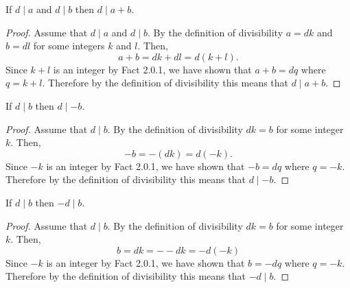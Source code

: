 \documentclass{report}
\begin{document}
\begin{proposition}{}{}
  If $d \mid a$ and $d \mid b$ then $d \mid a + b$.
\end{proposition}

\begin{proof}
  Assume that $d \mid a$ and $d \mid b$.
  By the definition of divisibility $a = dk$ and $b = dl$ for some integers $k$ and $l$.
  Then, $$a + b = dk + dl = d(k + l).$$
  Since $k + l$ is an integer by Fact 2.0.1, we have shown that $a + b = dq$ where $q = k + l$.
  Therefore by the definition of divisibility this means that $d \mid a + b$.
\end{proof}

\begin{proposition}{}{}
  If $d \mid b$ then $d \mid -b$.
\end{proposition}

\begin{proof}
  Assume that $d \mid b$.
  By the definition of divisibility $dk = b$ for some integer $k$.
  Then, $$-b = -(dk) = d(-k).$$
  Since $-k$ is an integer by Fact 2.0.1, we have shown that $-b = dq$ where $q = -k$.
  Therefore by the definition of divisibility this means that $d \mid -b$.
\end{proof}

\begin{proposition}{}{}
  If $d \mid b$ then $-d \mid b$.
\end{proposition}

\begin{proof}
  Assume that $d \mid b$.
  By the definition of divisibility $dk = b$ for some integer $k$.
  Then, $$b = dk = --dk = -d(-k)$$
  Since $-k$ is an integer by Fact 2.0.1, we have shown that $b = -dq$ where $q = -k$.
  Therefore by the definition of divisibility this means that $-d \mid b$.
\end{proof}
\end{document}
